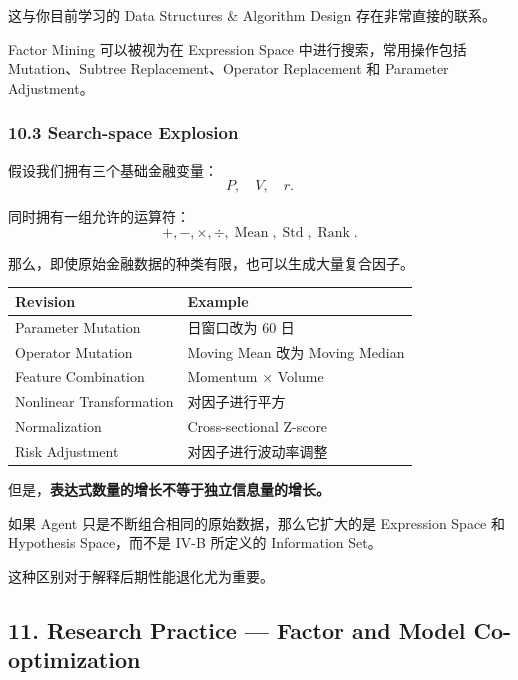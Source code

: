 
这与你目前学习的 Data Structures \& Algorithm Design 存在非常直接的联系。

Factor Mining 可以被视为在 Expression Space 中进行搜索，常用操作包括 Mutation、Subtree Replacement、Operator Replacement 和 Parameter Adjustment。

\hypertarget{part-4-63-0001-search-space-explosion}{%
\subsubsection{10.3 Search-space Explosion}\label{part-4-63-0001-search-space-explosion}}

假设我们拥有三个基础金融变量：
\[P,\quad V,\quad r.\]

同时拥有一组允许的运算符：
\[+,-,\times,\div,
\operatorname{Mean},
\operatorname{Std},
\operatorname{Rank}.\]

那么，即使原始金融数据的种类有限，也可以生成大量复合因子。

\begin{readertable}
\begin{longtable}[]{@{}
  >{\raggedright\arraybackslash}p{}
  >{\raggedright\arraybackslash}p{}@{}}
\toprule
Revision & Example \\
\midrule
\endhead
Parameter Mutation & 20 日窗口改为 60 日 \\
Operator Mutation & Moving Mean 改为 Moving Median \\
Feature Combination & Momentum × Volume \\
Nonlinear Transformation & 对因子进行平方 \\
Normalization & Cross-sectional Z-score \\
Risk Adjustment & 对因子进行波动率调整 \\
\bottomrule
\end{longtable}
\end{readertable}

但是，\textbf{表达式数量的增长不等于独立信息量的增长。}

如果 Agent 只是不断组合相同的原始数据，那么它扩大的是 Expression Space 和 Hypothesis Space，而不是 IV-B 所定义的 Information Set。

这种区别对于解释后期性能退化尤为重要。

\hypertarget{part-4-63-0001-research-practice-factor-and-model-co-optimization}{%
\subsection{11. Research Practice --- Factor and Model Co-optimization}\label{part-4-63-0001-research-practice-factor-and-model-co-optimization}}

